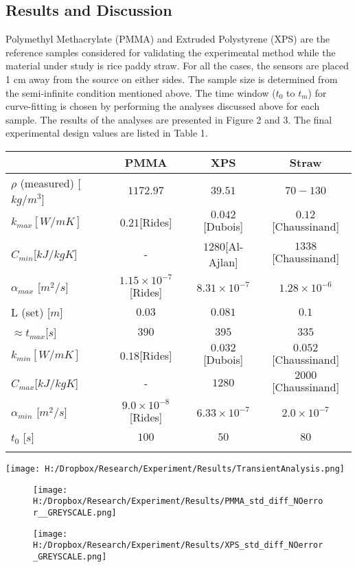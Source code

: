 \documentclass[]{article}
\begin{document}
\hypertarget{header-n56}{%
\subsection{Results and Discussion}\label{header-n56}}

 Polymethyl Methacrylate (PMMA) and Extruded Polystyrene (XPS) are the
reference samples considered for validating the experimental method
while the material under study is rice paddy straw. For all the cases,
the sensors are placed 1 cm away from the source on either sides. The
sample size is determined from the semi-infinite condition mentioned
above. The time window (\(t_0\) to \(t_m\)) for curve-fitting is chosen
by performing the analyses discussed above for each sample. The results
of the analyses are presented in Figure 2 and 3. The final experimental
design values are listed in Table 1.

\begin{longtable}[]{@{}l|c|c|c@{}}
\toprule
& PMMA & XPS & Straw\tabularnewline
\midrule
\endhead
\(\rho\) (measured) {[}\(kg/m^3\){]} & \(1172.97\) & \(39.51\) &
\(70-130\)\tabularnewline
\(k_{max} [W/mK]\) & \(0.21\){[}Rides{]} & \(0.042\){[}Dubois{]} &
\(0.12\) {[}Chaussinand{]}\tabularnewline
\(C_{min}\){[}\(kJ/kgK\){]} & - & \(1280\){[}Al-Ajlan{]} &
\(1338\){[}Chaussinand{]}\tabularnewline
\(\alpha_{max}\) {[}\(m^2/s\){]} & \(1.15 \times 10^{-7}\){[}Rides{]} &
\(8.31 \times 10^{-7}\) & \(1.28 \times 10^{-6}\)\tabularnewline
L (set) {[}\(m\){]} & \(0.03\) & \(0.081\) & \(0.1\)\tabularnewline
\(\approx t_{max}\){[}\(s\){]} & \(390\) & \(395\) &
\(335\)\tabularnewline
\(k_{min} [W/mK]\) & \(0.18\){[}Rides{]} & \(0.032\){[}Dubois{]} &
\(0.052\){[}Chaussinand{]}\tabularnewline
\(C_{max}\){[}\(kJ/kgK\){]} & - & \(1280\) &
\(2000\){[}Chaussinand{]}\tabularnewline
\(\alpha_{min}\) {[}\(m^2/s\){]} & \(9.0 \times 10^{-8}\){[}Rides{]} &
\(6.33 \times 10^{-7}\) & \(2.0 \times 10^{-7}\)\tabularnewline
\(t_0\) {[}\(s\){]} & \(100\) & \(50\) & \(80\)\tabularnewline
& & &\tabularnewline
\bottomrule
\end{longtable}

\texttt{[image: H:/Dropbox/Research/Experiment/Results/TransientAnalysis.png]}

\begin{figure}
\centering
\texttt{[image: H:/Dropbox/Research/Experiment/Results/PMMA\_std\_diff\_NOerror\_\_GREYSCALE.png]}
\caption{}
\end{figure}

\begin{figure}
\centering
\texttt{[image: H:/Dropbox/Research/Experiment/Results/XPS\_std\_diff\_NOerror\_GREYSCALE.png]}
\caption{}
\end{figure}
\end{document}
